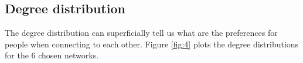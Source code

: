 \subsection{Degree distribution}
The degree distribution can superficially tell us what are the preferences for people when connecting to each other. Figure \ref{fig:4} plots the degree distributions for the 6 chosen networks.
\begin{figure}
    \centering
    \qquad
    \qquad
    \qquad

\end{figure}
